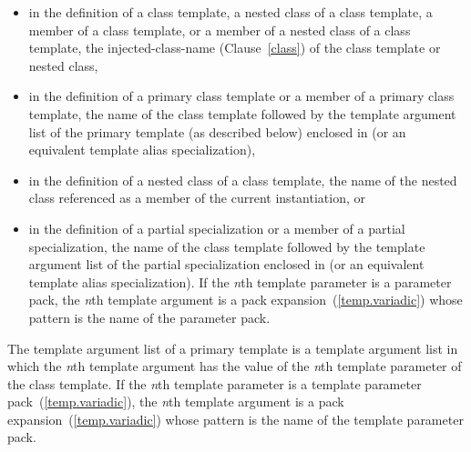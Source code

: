 \begin{itemize}
\item
in the definition of a class template, a nested class of a class template,
a member of a class template, or a member of a nested class of a class template,
the injected-class-name (Clause~\ref{class}) of the class template or nested class,
\item
in the definition of a primary class template
or a member of a primary class template, the name of the
class template followed by the template argument list of the
primary template (as described below) enclosed in
\tcode{<>} (or an equivalent template alias specialization),
\item
in the definition of a nested class of a class template,
the name of the nested class referenced as a member of the
current instantiation, or
\item
in the definition of a partial specialization
or a member of a partial specialization, the name of
the class template followed by the template argument list of
the partial specialization enclosed in
\tcode{<>} (or an equivalent template alias specialization).
If the \textit{n}th template parameter is
a parameter pack, the \textit{n}th template argument is a pack
expansion~(\ref{temp.variadic}) whose pattern is the name of
the parameter pack.
\end{itemize}

\pnum
The template argument list of a primary template is a
template argument list in which the
\textit{n}th
template argument has the value of the
\textit{n}th
template parameter of the class template.
If the \textit{n}th template parameter is a template
parameter pack~(\ref{temp.variadic}), the \textit{n}th template argument is a pack
expansion~(\ref{temp.variadic}) whose pattern is the name of
the template parameter pack.

